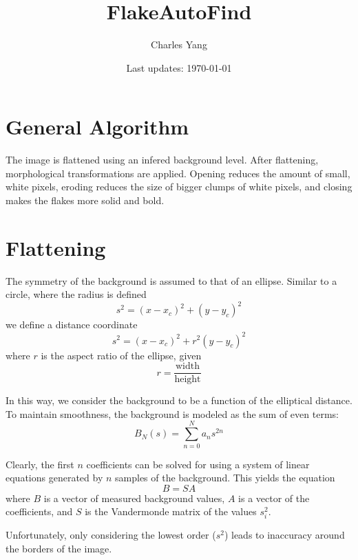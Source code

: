\documentclass{article}
\title{FlakeAutoFind}
\author{Charles Yang}
\date{Last updates: \today}
\begin{document}
\maketitle
\setcounter{tocdepth}{1}
\tableofcontents

\section{General Algorithm}
The image is flattened using an infered background level. After flattening, morphological transformations are applied. Opening reduces the amount of small, white pixels, eroding reduces the size of bigger clumps of white pixels, and closing makes the flakes more solid and bold. 

\section{Flattening}
The symmetry of the background is assumed to that of an ellipse. Similar to a circle, where the radius is defined
\[s^2=(x-x_c)^2+(y-y_c)^2\]
we define a distance coordinate
\[s^2=(x-x_c)^2+r^2(y-y_c)^2\]
where \(r\) is the aspect ratio of the ellipse, given
\[r = \frac{\text{width}}{\text{height}}\]

In this way, we consider the background to be a function of the elliptical distance. To maintain smoothness, the background is modeled as the sum of even terms:
\[B_N(s)=\sum_{n=0}^N a_ns^{2n}\]

Clearly, the first \(n\) coefficients can be solved for using a system of linear equations generated by \(n\) samples of the background. This yields the equation
\[B = SA\]
where \(B\) is a vector of measured background values, \(A\) is a vector of the coefficients, and \(S\) is the Vandermonde matrix of the values \(s_i^2\). 



Unfortunately, only considering the lowest order (\(s^2\)) leads to inaccuracy around the borders of the image. 
\end{document}
